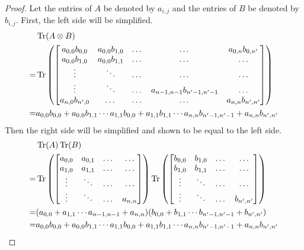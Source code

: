 \begin{proof}
Let the entries of $A$ be denoted by $a_{i,j}$ and the entries of $B$ be denoted by $b_{i,j}$. First, the left side will be simplified.
\begin{align}
&\operatorname{Tr}(A \otimes B)\\
=&\operatorname{Tr}\left(\begin{bmatrix} 
    a_{0,0}b_{0,0} & a_{0,0}b_{1,0} & \dots & \dots & a_{0,n}b_{0,n'}\\
    a_{0,0}b_{1,0} & a_{0,0}b_{1,1} & \dots & \dots & \dots\\
    \vdots & \ddots & \dots & \dots & \dots\\
    \vdots & \ddots & \dots & a_{n-1,n-1}b_{n'-1,n'-1} & \dots\\
    a_{n,0}b_{n',0} & \dots & \dots & \dots & a_{n,n}b_{n',n'} 
\end{bmatrix}\right)\\
=&a_{0,0}b_{0,0} + a_{0,0}b_{1,1} \cdots a_{1,1}b_{0,0} + a_{1,1}b_{1,1} \cdots a_{n,n}b_{n'-1,n'-1} + a_{n,n}b_{n',n'}
\end{align}
Then the right side will be simplified and shown to be equal to the left side.
\begin{align}
&\operatorname{Tr}(A)\operatorname{Tr}(B)\\
=&\operatorname{Tr}\left(\begin{bmatrix} 
    a_{0,0} & a_{0,1} & \dots & \dots\\
    a_{1,0} & a_{1,1} & \dots & \dots\\
    \vdots & \ddots & \dots & \dots\\
    \vdots & \ddots & \dots & a_{n,n}
\end{bmatrix}\right)\operatorname{Tr}\left(\begin{bmatrix} 
    b_{0,0} & b_{1,0} & \dots & \dots\\
    b_{1,0} & b_{1,1} & \dots & \dots\\
    \vdots & \ddots & \dots & \dots\\
    \vdots & \ddots & \dots & b_{n',n'}
\end{bmatrix}\right)\\
=&(a_{0,0} + a_{1,1} \cdots a_{n-1,n-1} + a_{n,n})(b_{0,0} + b_{1,1} \cdots b_{n'-1,n'-1} + b_{n',n'})\\
=&a_{0,0}b_{0,0} + a_{0,0}b_{1,1} \cdots a_{1,1}b_{0,0} + a_{1,1}b_{1,1} \cdots a_{n,n}b_{n'-1,n'-1} + a_{n,n}b_{n',n'}
\end{align}
\end{proof}


